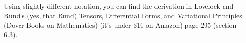 \documentclass[12pt]{article}
\numberwithin{equation}{section}
\begin{document}
Using slightly different notation, you can find the derivation in Lovelock and Rund's (yes, that Rund) Tensors, Differential Forms, and Variational Principles (Dover Books on Mathematics) (it's under \$10 on Amazon) page 205 (section 6.3).
%
%

\medskip


\end{document}
